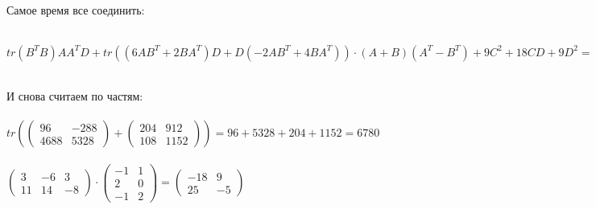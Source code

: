 \documentclass[a4paper, 12pt]{article}
\begin{document}
    \\
    \\ Самое время все соединить:
    \\
    \\ $tr(B^TB)AA^TD + tr((6AB^T + 2BA^T)D + D(-2AB^T + 4BA^T)) \cdot (A + B)(A^T - B^T) + 9C^2 + 18CD + 9D^2 =
    \begin{pmatrix}-2583 & -5535\\86469 & 91881\end{pmatrix} + tr(\begin{pmatrix}96 & -288\\4688 & 5328\end{pmatrix} + \begin{pmatrix}204 & 912\\108 & 1152\end{pmatrix}) \cdot \begin{pmatrix}3 & -6 & 3\\11 & 14 & -8\end{pmatrix} \cdot \begin{pmatrix}-1 & 1\\2 & 0\\-1 & 2\end{pmatrix} + \begin{pmatrix}54 & 126\\63 & 243\end{pmatrix} + \begin{pmatrix}-792 & -648\\-1044 & -972\end{pmatrix} + \begin{pmatrix}2250 & 1782\\1782 & 1458\end{pmatrix}$
    \\
    \\ И снова считаем по частям:
    \\
    \\ $tr(\begin{pmatrix}96 & -288\\4688 & 5328\end{pmatrix} + \begin{pmatrix}204 & 912\\108 & 1152\end{pmatrix}) = 96 + 5328 + 204 + 1152 = 6780$
    \\
    \\ $\begin{pmatrix}3 & -6 & 3\\11 & 14 & -8\end{pmatrix} \cdot \begin{pmatrix}-1 & 1\\2 & 0\\-1 & 2\end{pmatrix} = \begin{pmatrix}-18 & 9\\25 & -5\end{pmatrix}$
\end{document}
